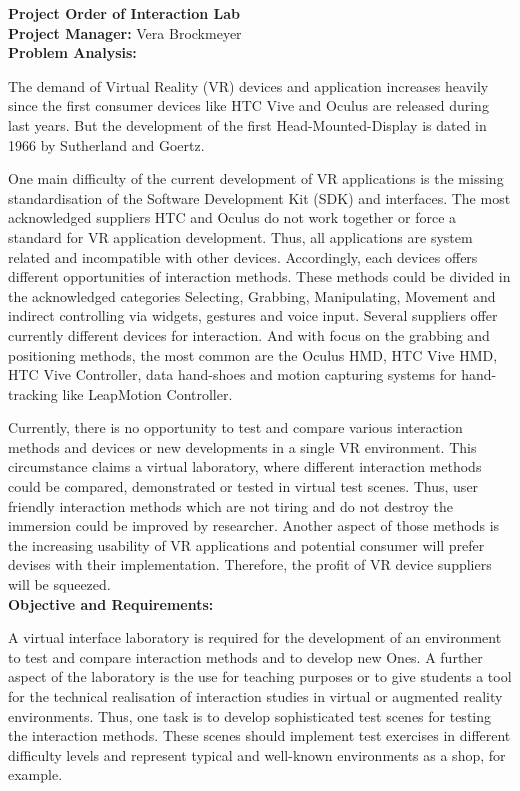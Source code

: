 \documentclass[a4paper, 12pt]{article}
\newcommand{\changefont}[3]{
\fontfamily{#1} \fontseries{#2} \fontshape{#3} \selectfont}
\begin{document}


\newpage


\textbf{\Large Project Order of Interaction Lab}\\


\textbf{Project Manager:} Vera Brockmeyer\\


\textbf{Problem Analysis:}

The demand of Virtual Reality (VR) devices and application increases heavily since the first consumer devices like HTC Vive and Oculus are released during last years. But the development of the first Head-Mounted-Display is dated in 1966 by Sutherland and Goertz. 

One main difficulty of the current development of VR applications is the missing standardisation of the Software Development Kit (SDK) and interfaces. The most acknowledged suppliers HTC and Oculus do not work together or force a standard for VR application development. Thus, all applications are system related and incompatible with other devices. Accordingly, each devices offers different opportunities of interaction methods. These methods could be divided in the acknowledged categories Selecting, Grabbing, Manipulating, Movement and indirect controlling via widgets, gestures and voice input. Several suppliers offer currently different devices for interaction. And with focus on the grabbing and positioning methods, the most common are the Oculus HMD, HTC Vive HMD, HTC Vive Controller, data hand-shoes and motion capturing systems for hand-tracking like LeapMotion Controller.

Currently, there is no opportunity to test and compare various interaction methods and devices or new developments in a single VR environment. This circumstance claims a virtual laboratory, where different interaction methods could be compared, demonstrated or tested in virtual test scenes. Thus, user friendly interaction methods which are not tiring and do not destroy the immersion could be improved by researcher. Another aspect of those methods is the increasing usability of VR applications and potential consumer will prefer devises with their implementation. Therefore, the profit of VR device suppliers will be squeezed. \\

\textbf{Objective and Requirements:}

A virtual interface laboratory is required for the development of an environment to test and compare interaction methods and to develop new Ones. A further aspect of the laboratory is the use for teaching purposes or to give students a tool for the technical realisation of interaction studies in virtual or augmented reality environments. Thus, one task is to develop sophisticated test scenes for testing the interaction methods. These scenes should implement test exercises in different difficulty levels and represent typical and well-known environments as a shop, for example. \\
\end{document}
